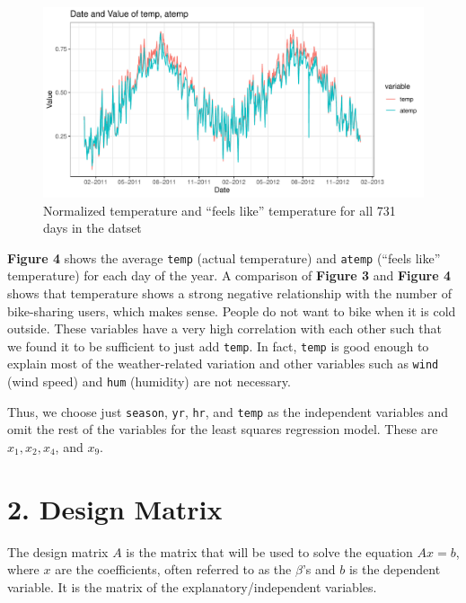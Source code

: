 \documentclass[
]{article}
\begin{document}
\newpage

\begin{figure}
\centering
\includegraphics{LeastSquares_files/figure-latex/unnamed-chunk-4-1.pdf}
\caption{Normalized temperature and ``feels like'' temperature for all
731 days in the datset}
\end{figure}

\textbf{Figure 4} shows the average \texttt{temp} (actual temperature)
and \texttt{atemp} (``feels like'' temperature) for each day of the
year. A comparison of \textbf{Figure 3} and \textbf{Figure 4} shows that
temperature shows a strong negative relationship with the number of
bike-sharing users, which makes sense. People do not want to bike when
it is cold outside. These variables have a very high correlation with
each other such that we found it to be sufficient to just add
\texttt{temp}. In fact, \texttt{temp} is good enough to explain most of
the weather-related variation and other variables such as \texttt{wind}
(wind speed) and \texttt{hum} (humidity) are not necessary.

Thus, we choose just \texttt{season}, \texttt{yr}, \texttt{hr}, and
\texttt{temp} as the independent variables and omit the rest of the
variables for the least squares regression model. These are
\(x_{1}, x_{2}, x_{4}\), and \(x_{9}\).

\newpage

\hypertarget{design-matrix}{%
\section{2. Design Matrix}\label{design-matrix}}

The design matrix \(A\) is the matrix that will be used to solve the
equation \(Ax = b\), where \(x\) are the coefficients, often referred to
as the \(\beta\)'s and \(b\) is the dependent variable. It is the matrix
of the explanatory/independent variables.
\end{document}
